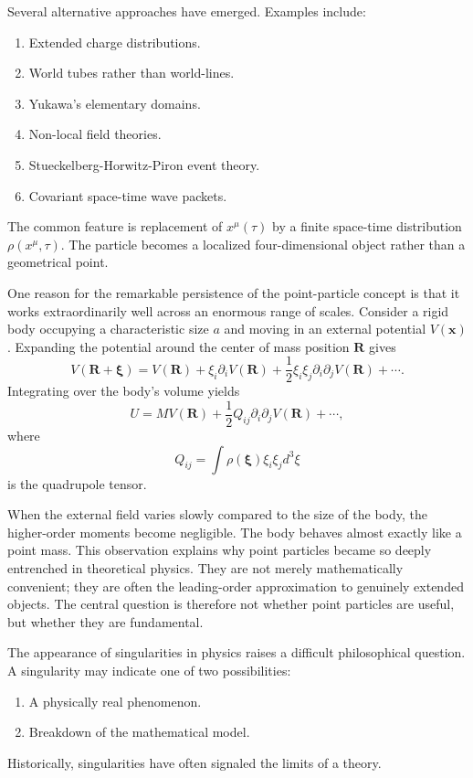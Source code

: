 Several alternative approaches have emerged.
Examples include:
\begin{enumerate}
\item Extended charge distributions.
\item World tubes rather than world-lines.
\item Yukawa's elementary domains.
\item Non-local field theories.
\item Stueckelberg-Horwitz-Piron event theory.
\item Covariant space-time wave packets.
\end{enumerate}
The common feature is replacement of $x^\mu(\tau)$
by a finite space-time distribution $\rho(x^\mu,\tau)$.
The particle becomes a localized four-dimensional object rather than a 
geometrical point.

One reason for the remarkable persistence of the point-particle concept 
is that it works extraordinarily well across an enormous range of scales.
Consider a rigid body occupying a characteristic size $a$ and moving in an
external potential $V(\mathbf{x})$. Expanding the potential around the 
center of mass position $\mathbf{R}$ gives
\begin{equation}
V(\mathbf{R}+\boldsymbol{\xi})=V(\mathbf{R})
+
\xi_i \partial_i V(\mathbf{R})
+
    \frac{1}{2} \xi_i \xi_j \partial_i\partial_j V(\mathbf{R})
+\cdots.
\end{equation}
Integrating over the body's volume yields
\begin{equation}
U=MV(\mathbf{R})+
    \frac{1}{2} Q_{ij}\partial_i\partial_jV(\mathbf{R})
+\cdots,
\end{equation}
where
\begin{equation}
Q_{ij}=\int \rho(\boldsymbol{\xi})
\xi_i\xi_j d^3\xi
\end{equation}
is the quadrupole tensor.

When the external field varies slowly compared to the size of the body, 
the higher-order moments become negligible. The body behaves almost exactly 
like a point mass.
This observation explains why point particles became so deeply entrenched in 
theoretical physics. They are not merely mathematically convenient; they are 
often the leading-order approximation to genuinely extended objects.
The central question is therefore not whether point particles are useful, 
but whether they are fundamental.


The appearance of singularities in physics raises a difficult philosophical question.
A singularity may indicate one of two possibilities:
\begin{enumerate}
\item A physically real phenomenon.
\item Breakdown of the mathematical model.
\end{enumerate}
Historically, singularities have often signaled the limits of a theory.

